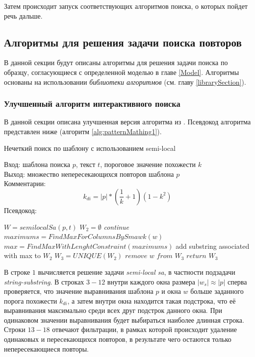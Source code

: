 Затем  происходит запуск соответствующих алгоритмов поиска, о которых пойдет речь дальше.


\subsection{Алгоритмы для решения задачи поиска повторов}\label{fics}

В данной секции будут описаны алгоритмы для решения задачи поиска по образцу, согласующиеся с определенной моделью в главе \ref{Model}.
Алгоритмы основаны на использовании \emph{библиотеки алгоритмов} (см. главу \ref{librarySection}).

\subsubsection{Улучшенный алгоритм интерактивного поиска}
В данной секции описана улучшенная версия алгоритма из \cite{luciv2019interactive}. Псевдокод алгоритма представлен ниже (алгоритм  \ref{alg:patternMathing1}).
\begin{algorithm}[H]
\caption{Нечеткий поиск по шаблону с использованием semi-local}\label{alg:patternMathing1}
Вход: шаблона поиска $p$, текст $t$, пороговое значение похожести $k$\\
Выход: множество непересекающихся повторов шаблона $p$\\
Комментарии:
\begin{equation}
    k_{di}=|p|*(\frac{1}{k}+1)(1-k^2)
\end{equation}
Псевдокод:
\begin{algorithmic}[1]
\State $W = semilocalSa(p,t)$
\State $W_2 = \emptyset$
   \State \emph{continue}
   \EndIf
   \State $maximums = FindMaxForColumnsBySmawk(w)$
   \State $max = FindMaxWithLenghtConstraint(maximums)$
    \State add substring associated with max to $W_{2}$ 
    \EndIf
\EndFor
\State $W_3 = UNIQUE(W_2)$
\State $remove$ $w$ $from$ $W_3$
\EndIf
\EndFor
\State $return$ $W_3$

\end{algorithmic}
\end{algorithm}

В строке $1$ вычисляется решение задачи \emph{semi-local sa}, в частности подзадачи \emph{string-substring}.
В строках ${3-12}$ внутри каждого окна размера $|w_{s}| \approx |p|$ сперва проверяется, что значение выравнивания шаблона $p$ и окна $w$ больше заданного порога похожести $k_{di}$, а затем внутри окна находится такая подстрока, что её выравнивания максимально среди всех друг подстрок данного окна. При одинаковом значении выравнивания будет выбираться наиболее длинная строка.
Строки ${13-18}$ отвечают фильтрации, в рамках которой происходит удаление одинаковых и пересекающихся повторов, в результате чего остаются только непересекающиеся повторы.

